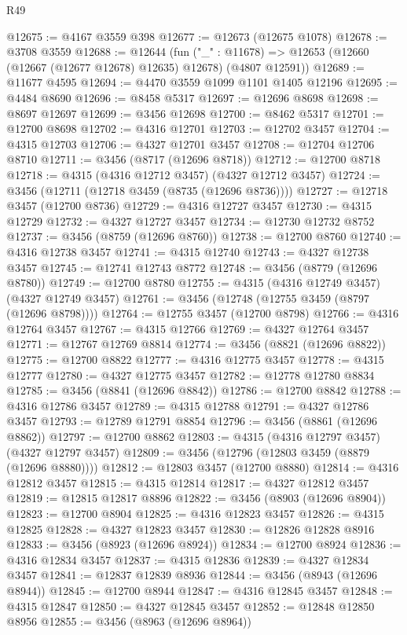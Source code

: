\begin{lexlean}{R49}
\begin{coremodule}
@12675 := @4167 @3559 @398
@12677 := @12673 (@12675 @1078)
@12678 := @3708 @3559
@12688 := @12644
    (fun ("_" : @11678) => @12653 (@12660 (@12667 (@12677 @12678) @12635) @12678) (@4807 @12591))
@12689 := @11677 @4595
@12694 := @4470 @3559 @1099 @1101 @1405 @12196
@12695 := @4484 @8690
@12696 := @8458 @5317
@12697 := @12696 @8698
@12698 := @8697 @12697
@12699 := @3456 @12698
@12700 := @8462 @5317
@12701 := @12700 @8698
@12702 := @4316 @12701
@12703 := @12702 @3457
@12704 := @4315 @12703
@12706 := @4327 @12701 @3457
@12708 := @12704 @12706 @8710
@12711 := @3456 (@8717 (@12696 @8718))
@12712 := @12700 @8718
@12718 := @4315 (@4316 @12712 @3457) (@4327 @12712 @3457)
@12724 := @3456 (@12711 (@12718 @3459 (@8735 (@12696 @8736))))
@12727 := @12718 @3457 (@12700 @8736)
@12729 := @4316 @12727 @3457
@12730 := @4315 @12729
@12732 := @4327 @12727 @3457
@12734 := @12730 @12732 @8752
@12737 := @3456 (@8759 (@12696 @8760))
@12738 := @12700 @8760
@12740 := @4316 @12738 @3457
@12741 := @4315 @12740
@12743 := @4327 @12738 @3457
@12745 := @12741 @12743 @8772
@12748 := @3456 (@8779 (@12696 @8780))
@12749 := @12700 @8780
@12755 := @4315 (@4316 @12749 @3457) (@4327 @12749 @3457)
@12761 := @3456 (@12748 (@12755 @3459 (@8797 (@12696 @8798))))
@12764 := @12755 @3457 (@12700 @8798)
@12766 := @4316 @12764 @3457
@12767 := @4315 @12766
@12769 := @4327 @12764 @3457
@12771 := @12767 @12769 @8814
@12774 := @3456 (@8821 (@12696 @8822))
@12775 := @12700 @8822
@12777 := @4316 @12775 @3457
@12778 := @4315 @12777
@12780 := @4327 @12775 @3457
@12782 := @12778 @12780 @8834
@12785 := @3456 (@8841 (@12696 @8842))
@12786 := @12700 @8842
@12788 := @4316 @12786 @3457
@12789 := @4315 @12788
@12791 := @4327 @12786 @3457
@12793 := @12789 @12791 @8854
@12796 := @3456 (@8861 (@12696 @8862))
@12797 := @12700 @8862
@12803 := @4315 (@4316 @12797 @3457) (@4327 @12797 @3457)
@12809 := @3456 (@12796 (@12803 @3459 (@8879 (@12696 @8880))))
@12812 := @12803 @3457 (@12700 @8880)
@12814 := @4316 @12812 @3457
@12815 := @4315 @12814
@12817 := @4327 @12812 @3457
@12819 := @12815 @12817 @8896
@12822 := @3456 (@8903 (@12696 @8904))
@12823 := @12700 @8904
@12825 := @4316 @12823 @3457
@12826 := @4315 @12825
@12828 := @4327 @12823 @3457
@12830 := @12826 @12828 @8916
@12833 := @3456 (@8923 (@12696 @8924))
@12834 := @12700 @8924
@12836 := @4316 @12834 @3457
@12837 := @4315 @12836
@12839 := @4327 @12834 @3457
@12841 := @12837 @12839 @8936
@12844 := @3456 (@8943 (@12696 @8944))
@12845 := @12700 @8944
@12847 := @4316 @12845 @3457
@12848 := @4315 @12847
@12850 := @4327 @12845 @3457
@12852 := @12848 @12850 @8956
@12855 := @3456 (@8963 (@12696 @8964))

\end{coremodule}
\end{lexlean}
